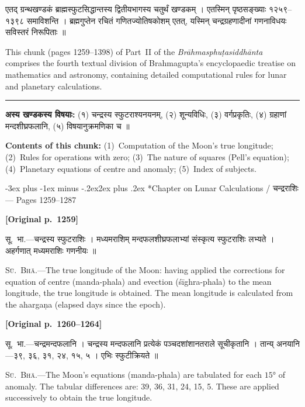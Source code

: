 \documentclass[11pt,a4paper]{article}
\makeatletter
\renewcommand{\section}{\@startsection {section}{1}{\z@}%
  {-3ex plus -1ex minus -.2ex}{2ex plus .2ex}%
  {\normalfont\Large\bfseries\color{sectioncolor}}}
\newcommand{\dev}[1]{{\devanagarifont\mdseries\upshape #1}}
\newcommand{\pagelabel}[1]{\textcolor{sectioncolor}{\textbf{[Original p.~#1]}}}
\newcommand{\bilingualpair}[2]{%
  \noindent%
  \begin{minipage}[t]{0.47\textwidth}
    \begin{flushleft}
      \small\dev{#1}
    \end{flushleft}
  \end{minipage}%
  \hfill\vrule\hfill%
  \begin{minipage}[t]{0.47\textwidth}
    \begin{flushleft}
      \small #2
    \end{flushleft}
  \end{minipage}%
  \par\vspace{1.2ex}
}
\makeatother
\begin{document}
\bilingualpair{%
एतद् ग्रन्थखण्डकं ब्राह्मस्फुटसिद्धान्तस्य द्वितीयभागस्य चतुर्थं खण्डकम् । एतस्मिन् पृष्ठसङ्ख्याः १२५९--१३९८ समाविशन्ति । ब्रह्मगुप्तेन रचितं गणितज्योतिषकोशम् एतत्, यस्मिन् चन्द्रग्रहणादीनां गणनाविधयः सविस्तरं निरूपिताः ॥
}{%
This chunk (pages 1259--1398) of Part~II of the \textit{Brāhmasphuṭasiddhānta} comprises the fourth textual division of Brahmagupta's encyclopaedic treatise on mathematics and astronomy, containing detailed computational rules for lunar and planetary calculations.
}

\vspace{1ex}
\noindent\rule{\textwidth}{0.3pt}
\vspace{1ex}

\bilingualpair{%
\textbf{अस्य खण्डकस्य विषयाः:} (१) चन्द्रस्य स्फुटराश्यनयनम्, (२) शून्यविधिः, (३) वर्गप्रकृतिः, (४) ग्रहाणां मन्दशीघ्रफलानि, (५) विषयानुक्रमणिका च ॥
}{%
\textbf{Contents of this chunk:} (1)~Computation of the Moon's true longitude; (2)~Rules for operations with zero; (3)~The nature of squares (Pell's equation); (4)~Planetary equations of centre and anomaly; (5)~Index of subjects.
}

\newpage

\section*{Chapter on Lunar Calculations / \dev{चन्द्रराशिः} --- Pages 1259--1287}

\pagelabel{1259}

\bilingualpair{%
सू.~भा.---चन्द्रस्य स्फुटराशिः । मध्यमराशिम् मन्दफलशीघ्रफलाभ्यां संस्कृत्य स्फुटराशिः लभ्यते । अहर्गणात् मध्यमराशिः गणनीयः ॥
}{%
\textsc{Sū.~Bhā.}---The true longitude of the Moon: having applied the corrections for equation of centre (manda-phala) and evection (śīghra-phala) to the mean longitude, the true longitude is obtained. The mean longitude is calculated from the ahargaṇa (elapsed days since the epoch).
}

\vspace{0.5ex}
\pagelabel{1260--1264}

\bilingualpair{%
सू.~भा.---चन्द्रमन्दफलानि । चन्द्रस्य मन्दफलानि प्रत्येकं पञ्चदशांशानतराले सूचीकृतानि । तान्य् अनयानि---३९, ३६, ३१, २४, १५, ५ । एभिः स्फुटीक्रियते ॥
}{%
\textsc{Sū.~Bhā.}---The Moon's equations (manda-phala) are tabulated for each $15°$ of anomaly. The tabular differences are: 39, 36, 31, 24, 15, 5. These are applied successively to obtain the true longitude.
}
\end{document}
